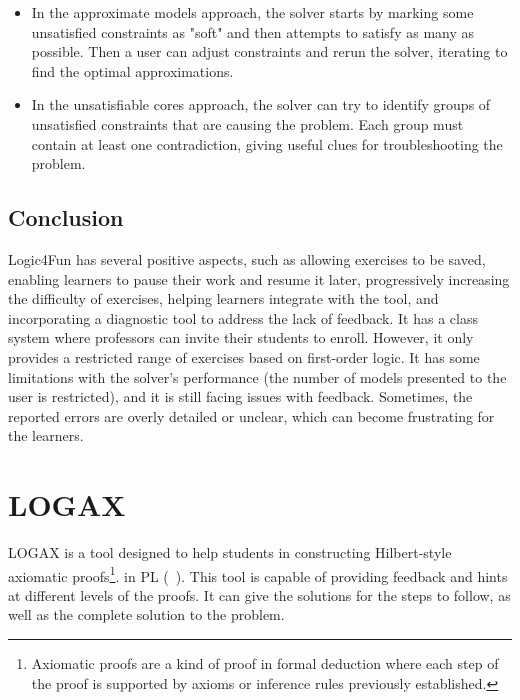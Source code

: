 \begin{itemize}
    \item In the approximate models approach, the solver starts by marking some unsatisfied constraints as "soft" and then attempts to satisfy as many as possible. Then a user can adjust constraints and rerun the solver, iterating to find the optimal approximations.
    \item In the unsatisfiable cores approach, the solver can try to identify groups of unsatisfied constraints that are causing the problem. Each group must contain at least one contradiction, giving useful clues for troubleshooting the problem.
\end{itemize}

\subsection{Conclusion}

Logic4Fun has several positive aspects, such as allowing exercises to be saved, enabling learners to pause their work and resume it later, progressively increasing the difficulty of exercises, helping learners integrate with the tool, and incorporating a diagnostic tool to address the lack of feedback. It has a class system where professors can invite their students to enroll. However, it only provides a restricted range of exercises based on first-order logic. It has some limitations with the solver's performance (the number of models presented to the user is restricted), and it is still facing issues with feedback. Sometimes, the reported errors are overly detailed or unclear, which can become frustrating for the learners.

\section{LOGAX}

LOGAX is a tool designed to help students in constructing Hilbert-style axiomatic proofs\footnote{Axiomatic proofs are a kind of proof in formal deduction where each step of the proof is supported by axioms or inference rules previously established.}. in \gls{PL} (~\cite{lodder_2020_generation}). This tool is capable of providing feedback and hints at different levels of the proofs. It can give the solutions for the steps to follow, as well as the complete solution to the problem.

